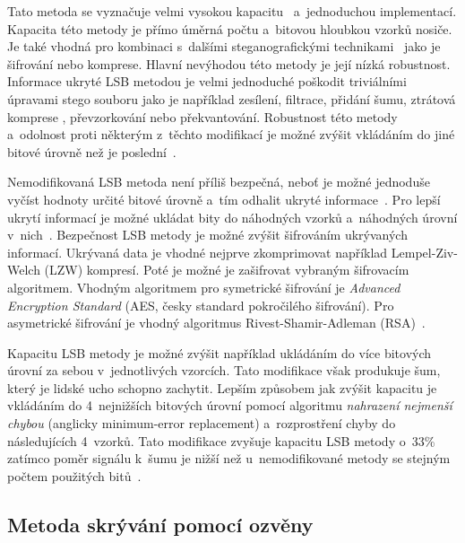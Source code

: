 Tato metoda se vyznačuje velmi vysokou kapacitu~\cite{Djebbar2012}
a~jednoduchou implementací. Kapacita této metody je přímo úměrná počtu
a~bitovou hloubkou vzorků nosiče. Je také vhodná pro kombinaci s~dalšími
steganografickými technikami~\cite{Djebbar2012} jako je šifrování nebo
komprese. Hlavní nevýhodou této metody je její nízká robustnost. Informace
ukryté LSB metodou je velmi jednoduché poškodit triviálními úpravami stego
souboru jako je například zesílení, filtrace, přidání šumu, ztrátová komprese
\cite{Djebbar2012}, převzorkování nebo překvantování. Robustnost této metody
a~odolnost proti některým z~těchto modifikací je možné zvýšit vkládáním do jiné
bitové úrovně než je poslední~\cite{Djebbar2012}.

Nemodifikovaná LSB metoda není příliš bezpečná, neboť je možné jednoduše vyčíst
hodnoty určité bitové úrovně a~tím odhalit ukryté informace~\cite{Djebbar2012}.
Pro lepší ukrytí informací je možné ukládat bity do náhodných vzorků
a~náhodných úrovní v~nich~\cite{Dutta2020}. Bezpečnost LSB metody je možné
zvýšit šifrováním ukrývaných informací. Ukrývaná data je vhodné nejprve
zkomprimovat například Lempel-Ziv-Welch (LZW) kompresí. Poté je možné je
zašifrovat vybraným šifrovacím algoritmem. Vhodným algoritmem pro symetrické
šifrování je \textit{Advanced Encryption Standard} (AES, česky standard
pokročilého šifrování). Pro asymetrické šifrování je vhodný algoritmus
Rivest-Shamir-Adleman (RSA)~\cite{Dutta2020}.

Kapacitu LSB metody je možné zvýšit například ukládáním do více bitových úrovní
za sebou v~jednotlivých vzorcích. Tato modifikace však produkuje šum, který je
lidské ucho schopno zachytit. Lepším způsobem jak zvýšit kapacitu je vkládáním
do 4~nejnižších bitových úrovní pomocí algoritmu \textit{nahrazení nejmenší
chybou} (anglicky minimum-error replacement) a~rozprostření chyby do
následujících 4~vzorků. Tato modifikace zvyšuje kapacitu LSB metody o~33\%
zatímco poměr signálu k~šumu je nižší než u~nemodifikované metody se stejným
počtem použitých bitů~\cite{Cvejic2002}.

\subsection*{Metoda skrývání pomocí ozvěny}
\label{sub:echo-hiding}

